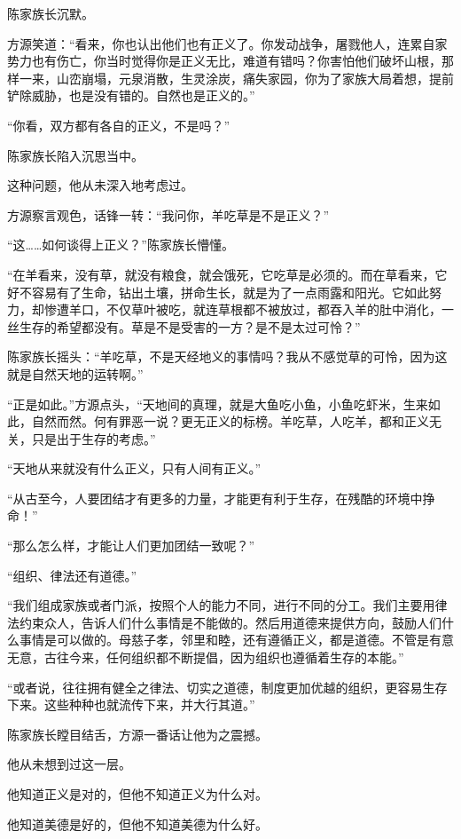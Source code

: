 \begin{this_body}
陈家族长沉默。

方源笑道：“看来，你也认出他们也有正义了。你发动战争，屠戮他人，连累自家势力也有伤亡，你当时觉得你是正义无比，难道有错吗？你害怕他们破坏山根，那样一来，山峦崩塌，元泉消散，生灵涂炭，痛失家园，你为了家族大局着想，提前铲除威胁，也是没有错的。自然也是正义的。”

“你看，双方都有各自的正义，不是吗？”

陈家族长陷入沉思当中。

这种问题，他从未深入地考虑过。

方源察言观色，话锋一转：“我问你，羊吃草是不是正义？”

“这……如何谈得上正义？”陈家族长懵懂。

“在羊看来，没有草，就没有粮食，就会饿死，它吃草是必须的。而在草看来，它好不容易有了生命，钻出土壤，拼命生长，就是为了一点雨露和阳光。它如此努力，却惨遭羊口，不仅草叶被吃，就连草根都不被放过，都吞入羊的肚中消化，一丝生存的希望都没有。草是不是受害的一方？是不是太过可怜？”

陈家族长摇头：“羊吃草，不是天经地义的事情吗？我从不感觉草的可怜，因为这就是自然天地的运转啊。”

“正是如此。”方源点头，“天地间的真理，就是大鱼吃小鱼，小鱼吃虾米，生来如此，自然而然。何有罪恶一说？更无正义的标榜。羊吃草，人吃羊，都和正义无关，只是出于生存的考虑。”

“天地从来就没有什么正义，只有人间有正义。”

“从古至今，人要团结才有更多的力量，才能更有利于生存，在残酷的环境中挣命！”

“那么怎么样，才能让人们更加团结一致呢？”

“组织、律法还有道德。”

“我们组成家族或者门派，按照个人的能力不同，进行不同的分工。我们主要用律法约束众人，告诉人们什么事情是不能做的。然后用道德来提供方向，鼓励人们什么事情是可以做的。母慈子孝，邻里和睦，还有遵循正义，都是道德。不管是有意无意，古往今来，任何组织都不断提倡，因为组织也遵循着生存的本能。”

“或者说，往往拥有健全之律法、切实之道德，制度更加优越的组织，更容易生存下来。这些种种也就流传下来，并大行其道。”

陈家族长瞠目结舌，方源一番话让他为之震撼。

他从未想到过这一层。

他知道正义是对的，但他不知道正义为什么对。

他知道美德是好的，但他不知道美德为什么好。


\end{this_body}

